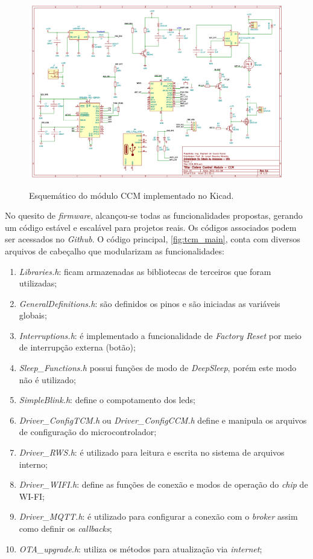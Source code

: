 \begin{figure}[H]
	\centering
	\caption{Esquemático do módulo CCM implementado no Kicad.}
	\includegraphics[width=1\textwidth]{figuras/kicad_ccm.png}
	\label{fig:kicad_ccm}
\end{figure}



No quesito de \textit{firmware}, alcançou-se todas as funcionalidades propostas, gerando um código estável e escalável para projetos reais. Os códigos associados podem ser acessados no \textit{Github}. O código principal, \autoref{fig:tcm_main}, conta com diversos arquivos de cabeçalho que modularizam as funcionalidades: 

\begin{enumerate}
	\item \textit{Libraries.h}: ficam armazenadas as bibliotecas de terceiros que foram utilizadas;
	\item \textit{GeneralDefinitions.h}: são definidos os pinos e são iniciadas as variáveis globais;
	\item \textit{Interruptions.h}: é implementado a funcionalidade de \textit{Factory Reset} por meio de interrupção externa (botão);
	\item \textit{Sleep\_Functions.h} possui funções de modo de \textit{DeepSleep}, porém este modo não é utilizado;
	\item  \textit{SimpleBlink.h}: define o compotamento dos leds;
	\item \textit{Driver\_ConfigTCM.h} ou \textit{Driver\_ConfigCCM.h} define e manipula os arquivos de configuração do microcontrolador;
	\item \textit{Driver\_RWS.h}: é utilizado para leitura e escrita no sistema de arquivos interno;
	\item \textit{Driver\_WIFI.h}: define as funções de conexão e modos de operação do \textit{chip} de WI-FI;
	\item \textit{Driver\_MQTT.h}: é utilizado para configurar a conexão com o \textit{broker} assim como definir os \textit{callbacks};
	\item \textit{OTA\_upgrade.h}: utiliza os métodos para atualização via \textit{internet};
	
\end{enumerate}

